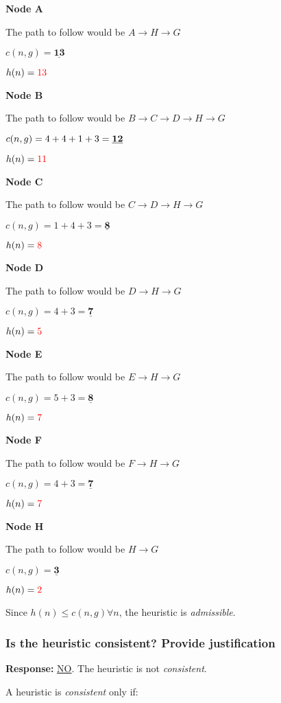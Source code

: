 \documentclass[12pt, letterpaper]{article}
\begin{document}
\textbf{Node A}

The path to follow would be $A\rightarrow H\rightarrow G$

$c(n,g)=\underline{\textbf{13}}$

$h(n)=\textcolor{red}{13}$

\textbf{Node B}

The path to follow would be $B\rightarrow C\rightarrow D\rightarrow H\rightarrow G$

$c(n,g)=4+4+1+3=\textbf{\underline{12}}$

$h(n)=\textcolor{red}{11}$

\textbf{Node C}

The path to follow would be $C\rightarrow D\rightarrow H\rightarrow G$

$c(n,g)=1+4+3=\underline{\textbf{8}}$

$h(n)=\textcolor{red}{8}$

\textbf{Node D}

The path to follow would be $D\rightarrow H\rightarrow G$

$c(n,g)=4+3=\underline{\textbf{7}}$ 

$h(n)=\textcolor{red}{5}$

\textbf{Node E}

The path to follow would be $E\rightarrow H\rightarrow G$

$c(n,g)=5+3=\underline{\textbf{8}}$ 

$h(n)=\textcolor{red}{7}$

\textbf{Node F}

The path to follow would be $F\rightarrow H\rightarrow G$

$c(n,g)=4+3=\underline{\textbf{7}}$ 

$h(n)=\textcolor{red}{7}$

\textbf{Node H}

The path to follow would be $H\rightarrow G$

$c(n,g)=\underline{\textbf{3}}$ 

$h(n)=\textcolor{red}{2}$

Since $h(n)\leq c(n,g) \forall n$, the heuristic is \textit{admissible}.

\subsubsection{Is the heuristic consistent? Provide justification}
\textbf{Response:} \underline{NO}. The heuristic is not \textit{consistent}.

A heuristic is \textit{consistent} only if:
\end{document}
